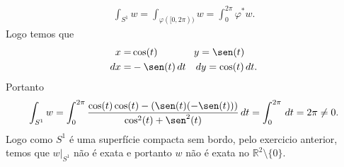 \begin{homeworkProblem}[Seção 2-7]
\begin{solution}
\begin{align*}
      \int_{S^{1}}w=\int_{\varphi([0,2\pi))}w=\int_{0}^{2\pi}\varphi^{\ast}w.
    \end{align*}
    Logo temos que
    \begin{align*}
      x=&\cos(t)\quad\quad\quad\,\,\,\, y=\sen(t)\\
      dx=&-\sen(t)\,dt\quad dy=\cos(t)\,dt.
    \end{align*}
    Portanto
    \begin{align*}
      \int_{S^{1}}w=\int_{0}^{2\pi}\frac{\cos(t)\cos(t)-(\sen(t)(-\sen(t)))}{\cos^{2}(t)+\sen^{2}(t)}\,dt=\int_{0}^{2\pi}\,dt=2\pi\neq 0.
    \end{align*}
    Logo como $S^{1}$ é uma superfície compacta sem bordo, pelo exercicio anterior, temos que $w\big|_{S^{1}}$ não é exata e portanto $w$ não é exata no $\mathbb{R}^{2}\setminus\{0\}$. 
  \end{solution}
\end{homeworkProblem}
